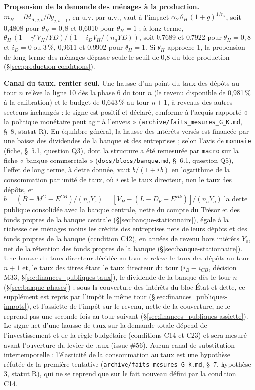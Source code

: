 \documentclass[11pt,a4paper]{article}
\begin{document}
\begin{proposee}
\textbf{Propension de la demande des ménages à la production.} $m_H = \partial d_{H,j,t}/\partial y_{j,t-1}$, en u.v. par u.v., vaut à l'impact $\alpha_Y\,\theta_H\,(1 + g)^{1/n_a}$, soit 0,4808 pour $\theta_H = 0{,}8$ et 0,6010 pour $\theta_H = 1$ ; à long terme, $\theta_H\,(1 - \gamma^e V_H/\mathit{YD})/(1 - i_D V_H/(n_a\mathit{YD}))$, soit 0,7689 et 0,7922 pour $\theta_H = 0{,}8$ et $i_D = 0$ ou 3\,\%, 0,9611 et 0,9902 pour $\theta_H = 1$. Si $\theta_H$ approche 1, la propension de long terme des ménages dépasse seule le seuil de 0,8 du bloc production (\S\ref{sec:production-conditions}).

\textbf{Canal du taux, rentier seul.} Une hausse d'un point du taux des dépôts au tour $n$ relève la ligne 10 dès la phase 6 du tour $n$ (le revenu disponible de 0,981\,\% à la calibration) et le budget de 0,643\,\% au tour $n + 1$, à revenus des autres secteurs inchangés : le signe est positif et déclaré, conforme à l'acquis rapporté « la politique monétaire peut agir à l'envers » (\nolinkurl{archive/faits_mesures_G_K.md}, \S~8, statut R). En équilibre général, la hausse des intérêts versés est financée par une baisse des dividendes de la banque et des entreprises ; selon l'avis de \texttt{monnaie} (fiche, \S~6.1, question Q3), dont la structure a été remesurée par \texttt{macro} sur la fiche « banque commerciale » (\nolinkurl{docs/blocs/banque.md}, \S~6.1, question Q5), l'effet de long terme, à dette donnée, vaut $b/(1 + i\,b)$ en logarithme de la consommation par unité de taux, où $i$ est le taux directeur, non le taux des dépôts, et $b = (B - M^G - E^{\mathit{CB}})/(n_a Y_o) = [V_H - (L - D_F - E^{\mathit{Bk}})]/(n_a Y_o)$ la dette publique consolidée avec la banque centrale, nette du compte du Trésor et des fonds propres de la banque centrale (\S\ref{sec:banque-stationnaire}), égale à la richesse des ménages moins les crédits des entreprises nets de leurs dépôts et des fonds propres de la banque (condition C42), en années de revenu hors intérêts $Y_o$, net de la rétention des fonds propres de la banque (\S\ref{sec:banque-stationnaire}). Une hausse du taux directeur décidée au tour $n$ relève le taux des dépôts au tour $n + 1$ et, le taux des titres étant le taux directeur du tour ($i_B \equiv i_{\mathit{CB}}$, décision M33, \S\ref{sec:finances_publiques-taux}), le dividende de la banque dès le tour $n$ (\S\ref{sec:banque-phases}) ; sous la couverture des intérêts du bloc État et dette, ce supplément est repris par l'impôt le même tour (\S\ref{sec:finances_publiques-impots}), et l'assiette de l'impôt sur le revenu, nette de la couverture, ne le reprend pas une seconde fois au tour suivant (\S\ref{sec:finances_publiques-assiette}). Le signe net d'une hausse de taux sur la demande totale dépend de l'investissement et de la règle budgétaire (conditions C14 et C23) et sera mesuré avant l'ouverture du levier de taux (issue \#56). Aucun canal de substitution intertemporelle : l'élasticité de la consommation au taux est une hypothèse réfutée de la première tentative (\nolinkurl{archive/faits_mesures_G_K.md}, \S~7, hypothèse 3, statut R), qui ne se reprend que sur le fait nouveau défini par la condition C14.


\end{proposee}
\end{document}
